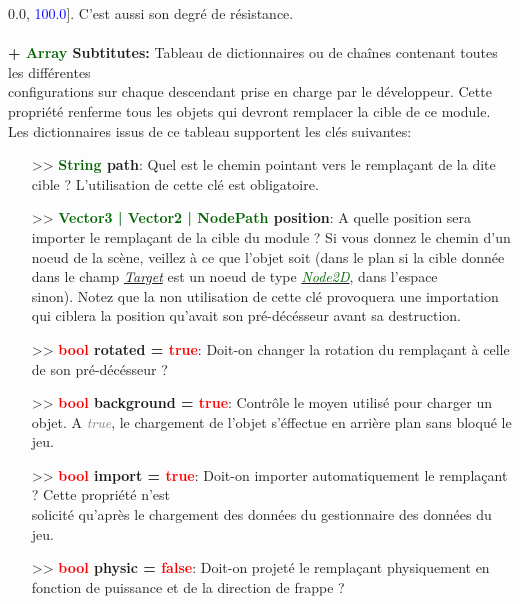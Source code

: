 \documentclass[a4paper, 11pt]{article}
\begin{document}
	{0.0}, \textcolor{blue}{100.0}]. C'est aussi son degré de résistance.\\\\
	\textbf{+ \textcolor{darkgreen}{Array} Subtitutes:} Tableau de dictionnaires ou de chaînes contenant 
	toutes les différentes \\configurations sur chaque descendant prise en charge par le développeur. Cette 
	propriété renferme tous les objets qui devront remplacer la cible de ce module. Les dictionnaires issus 
	de ce tableau supportent les clés suivantes:
	\begin{itemize}
		\item[>> \textbf{\textcolor{darkgreen}{String} path}:] Quel est le chemin pointant vers le 
		remplaçant de la dite cible ? L'utilisation de cette clé est obligatoire.\\
		\item[>> \textbf{\textcolor{darkgreen}{Vector3 | Vector2 | NodePath} position}:] A quelle position 
		sera importer le remplaçant de la cible du module ? Si vous donnez le chemin d'un noeud de la scène, 
		veillez à ce que l'objet soit (dans le plan si la cible donnée dans le champ 
		\textit{\hyperlink{target}{Target}} est un noeud de type
		\href{https://docs.godotengine.org/en/stable/classes/class_node2d.html}
		{\textit{\textcolor{darkgreen}{Node2D}}}, dans l'espace \\sinon). 
		Notez que la non utilisation de cette clé provoquera une importation qui ciblera la position 
		qu'avait son pré-décésseur avant sa destruction.\\
		\item[>> \textbf{\textcolor{red}{bool} rotated = \textcolor{red}{true}}:] Doit-on changer la 
		rotation du remplaçant à celle de son pré-décésseur ?\\
		\item[>> \textbf{\textcolor{red}{bool} background = \textcolor{red}{true}}:] Contrôle le moyen 
		utilisé pour charger un objet. A \textit{\textcolor{gray}{true}}, le chargement de l'objet 
		s'éffectue en arrière plan sans bloqué le jeu.\\
		\item[>> \textbf{\textcolor{red}{bool} import = \textcolor{red}{true}}:] Doit-on importer 
		automatiquement le remplaçant ? Cette propriété n'est \\solicité qu'après le chargement des données
		du gestionnaire des données du jeu.\\
		\item[>> \textbf{\textcolor{red}{bool} physic = \textcolor{red}{false}}:] Doit-on projeté le 
		remplaçant physiquement en fonction de puissance et de la direction de frappe ?\\
	\end{itemize}
\end{document}

